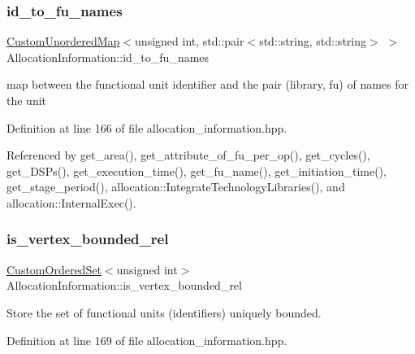 \subsubsection{\texorpdfstring{id\+\_\+to\+\_\+fu\+\_\+names}{id\_to\_fu\_names}}
{\footnotesize\ttfamily \hyperlink{custom__map_8hpp_ad1ed68f2ff093683ab1a33522b144adc}{Custom\+Unordered\+Map}$<$unsigned int, std\+::pair$<$std\+::string, std\+::string$>$ $>$ Allocation\+Information\+::id\+\_\+to\+\_\+fu\+\_\+names\hspace{0.3cm}{\ttfamily [private]}}



map between the functional unit identifier and the pair (library, fu) of names for the unit 



Definition at line 166 of file allocation\+\_\+information.\+hpp.



Referenced by get\+\_\+area(), get\+\_\+attribute\+\_\+of\+\_\+fu\+\_\+per\+\_\+op(), get\+\_\+cycles(), get\+\_\+\+D\+S\+Ps(), get\+\_\+execution\+\_\+time(), get\+\_\+fu\+\_\+name(), get\+\_\+initiation\+\_\+time(), get\+\_\+stage\+\_\+period(), allocation\+::\+Integrate\+Technology\+Libraries(), and allocation\+::\+Internal\+Exec().

\mbox{\label{classAllocationInformation_a8f7512d362462641f5811475a58c473b}} 
\subsubsection{\texorpdfstring{is\+\_\+vertex\+\_\+bounded\+\_\+rel}{is\_vertex\_bounded\_rel}}
{\footnotesize\ttfamily \hyperlink{classCustomOrderedSet}{Custom\+Ordered\+Set}$<$unsigned int$>$ Allocation\+Information\+::is\+\_\+vertex\+\_\+bounded\+\_\+rel\hspace{0.3cm}{\ttfamily [private]}}



Store the set of functional units (identifiers) uniquely bounded. 



Definition at line 169 of file allocation\+\_\+information.\+hpp.



